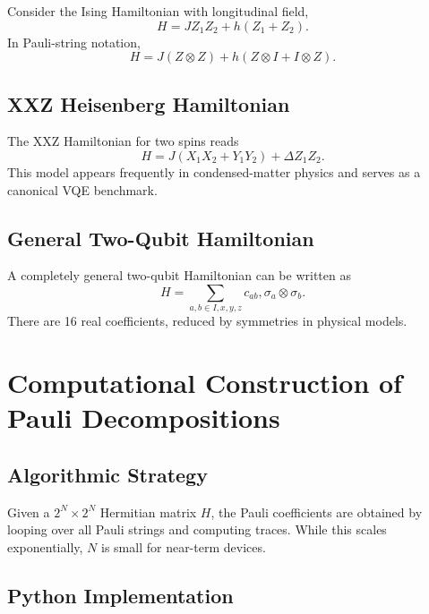 \documentclass{book}
\begin{document}
Consider the Ising Hamiltonian with longitudinal field,
\begin{equation}
H = J Z_1 Z_2 + h(Z_1 + Z_2).
\end{equation}
In Pauli-string notation,
\begin{equation}
H = J (Z \otimes Z) + h (Z \otimes I + I \otimes Z).
\end{equation}

\subsection{XXZ Heisenberg Hamiltonian}

The XXZ Hamiltonian for two spins reads
\begin{equation}
H = J(X_1 X_2 + Y_1 Y_2) + \Delta Z_1 Z_2.
\end{equation}
This model appears frequently in condensed-matter physics and serves as a canonical VQE benchmark.

\subsection{General Two-Qubit Hamiltonian}

A completely general two-qubit Hamiltonian can be written as
\begin{equation}
H = \sum_{a,b \in {I,x,y,z}} c_{ab} , \sigma_a \otimes \sigma_b.
\end{equation}
There are 16 real coefficients, reduced by symmetries in physical models.

\section{Computational Construction of Pauli Decompositions}

\subsection{Algorithmic Strategy}

Given a $2^N \times 2^N$ Hermitian matrix $H$, the Pauli coefficients are obtained by looping over all Pauli strings and computing traces. While this scales exponentially, $N$ is small for near-term devices.

\subsection{Python Implementation}
\end{document}
